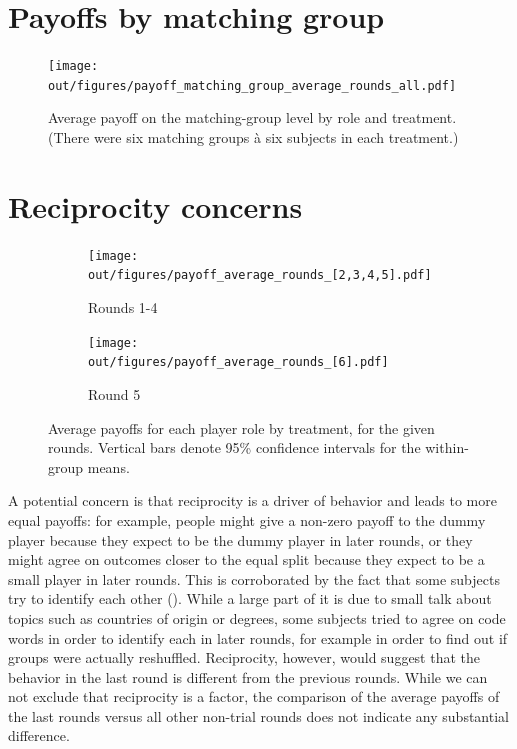 \documentclass[12pt]{article}
\begin{document}
\section{Payoffs by matching group}

\begin{figure}[!htb]
    \centering
    \texttt{[image: out/figures/payoff\_matching\_group\_average\_rounds\_all.pdf]}
    \caption{Average payoff on the matching-group level by role and treatment. (There were six matching groups à six subjects in each treatment.)}
    \label{fig:matching_group}
\end{figure}

\section{Reciprocity concerns}

\begin{figure}[!htb]
    \centering
    \begin{subfigure}[b]{0.49\textwidth}
        \centering
        \texttt{[image: out/figures/payoff\_average\_rounds\_[2,3,4,5].pdf]}
        \caption{Rounds 1-4}
    \end{subfigure}
    \hfill
    \begin{subfigure}[b]{0.49\textwidth}
        \centering
        \texttt{[image: out/figures/payoff\_average\_rounds\_[6].pdf]}
        \caption{Round 5}
    \end{subfigure}
    \caption{Average payoffs for each player role by treatment, for the given rounds. Vertical bars denote 95\% confidence intervals for the within-group means.}
    \label{fig:reciprocity}
\end{figure}

A potential concern is that reciprocity is a driver of behavior and leads to more equal payoffs: for example, people might give a non-zero payoff to the dummy player because they expect to be the dummy player in later rounds, or they might agree on outcomes closer to the equal split because they expect to be a small player in later rounds. This is corroborated by the fact that some subjects try to identify each other (). While a large part of it is due to small talk about topics such as countries of origin or degrees, some subjects tried to agree on code words in order to identify each in later rounds, for example in order to find out if groups were actually reshuffled. Reciprocity, however, would suggest that the behavior in the last round is different from the previous rounds. While we can not exclude that reciprocity is a factor, the comparison of the average payoffs of the last rounds versus all other non-trial rounds does not indicate any substantial difference.
\end{document}
